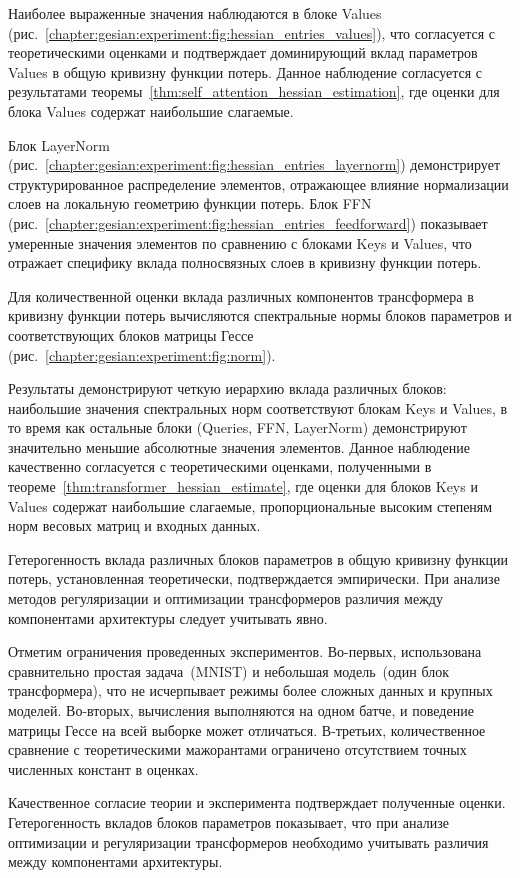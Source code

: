 Наиболее выраженные значения наблюдаются в блоке Values (рис.~\ref{chapter:gesian:experiment:fig:hessian_entries_values}), что согласуется с теоретическими оценками и подтверждает доминирующий вклад параметров Values в общую кривизну функции потерь. Данное наблюдение согласуется с результатами теоремы~\ref{thm:self_attention_hessian_estimation}, где оценки для блока Values содержат наибольшие слагаемые.

Блок LayerNorm (рис.~\ref{chapter:gesian:experiment:fig:hessian_entries_layernorm}) демонстрирует структурированное распределение элементов, отражающее влияние нормализации слоев на локальную геометрию функции потерь. Блок FFN (рис.~\ref{chapter:gesian:experiment:fig:hessian_entries_feedforward}) показывает умеренные значения элементов по сравнению с блоками Keys и Values, что отражает специфику вклада полносвязных слоев в кривизну функции потерь.

Для количественной оценки вклада различных компонентов трансформера в кривизну функции потерь вычисляются спектральные нормы блоков параметров и соответствующих блоков матрицы Гессе (рис.~\ref{chapter:gesian:experiment:fig:norm}).

Результаты демонстрируют четкую иерархию вклада различных блоков: наибольшие значения спектральных норм соответствуют блокам Keys и Values, в то время как остальные блоки (Queries, FFN, LayerNorm) демонстрируют значительно меньшие абсолютные значения элементов. Данное наблюдение качественно согласуется с теоретическими оценками, полученными в теореме~\ref{thm:transformer_hessian_estimate}, где оценки для блоков Keys и Values содержат наибольшие слагаемые, пропорциональные высоким степеням норм весовых матриц и входных данных.

Гетерогенность вклада различных блоков параметров в общую кривизну функции потерь, установленная теоретически, подтверждается эмпирически. При анализе методов регуляризации и оптимизации трансформеров различия между компонентами архитектуры следует учитывать явно.

Отметим ограничения проведенных экспериментов. Во-первых, использована сравнительно простая задача~(MNIST) и небольшая модель~(один блок трансформера), что не исчерпывает режимы более сложных данных и крупных моделей. Во-вторых, вычисления выполняются на одном батче, и поведение матрицы Гессе на всей выборке может отличаться. В-третьих, количественное сравнение с теоретическими мажорантами ограничено отсутствием точных численных констант в оценках.

Качественное согласие теории и эксперимента подтверждает полученные оценки. Гетерогенность вкладов блоков параметров показывает, что при анализе оптимизации и регуляризации трансформеров необходимо учитывать различия между компонентами архитектуры.

